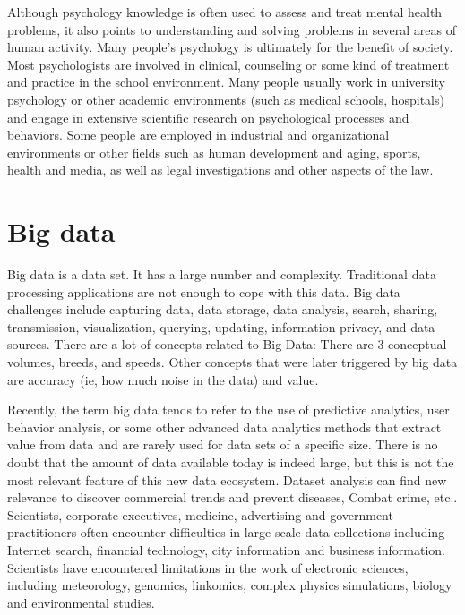 Although psychology knowledge is often used to assess and treat 
mental health problems, it also points to understanding and solving 
problems in several areas of human activity. Many people's psychology
 is ultimately for the benefit of society. Most psychologists are 
involved in clinical, counseling or some kind of treatment and 
practice in the school environment. Many people usually work in 
university psychology or other academic environments (such as medical
 schools, hospitals) and engage in extensive scientific research on 
psychological processes and behaviors. Some people are employed in 
industrial and organizational environments or other fields such as 
human development and aging, sports, health and media, as well as 
legal investigations and other aspects of the law.

\section{Big data}

Big data is a data set. It has a large number and complexity. 
Traditional data processing applications are not enough to cope with 
this data. Big data challenges include capturing data, data storage, 
data analysis, search, sharing, transmission, visualization, querying,
 updating, information privacy, and data sources. There are a lot of 
concepts related to Big Data: There are 3 conceptual volumes, breeds,
 and speeds. Other concepts that were later triggered by big data are
 accuracy (ie, how much noise in the data) and value\cite{editor03}.

Recently, the term big data tends to refer to the use of predictive 
analytics, user behavior analysis, or some other advanced data 
analytics methods that extract value from data and are rarely used for
 data sets of a specific size. There is no doubt that the amount of 
data available today is indeed large, but this is not the most 
relevant feature of this new data ecosystem. Dataset analysis can 
find new relevance to discover commercial trends and prevent 
diseases, Combat crime, etc.\cite{editor04}.  Scientists, corporate 
executives, medicine, advertising and government practitioners often 
encounter difficulties in large-scale data collections including Internet 
search, financial technology, city information and business 
information. Scientists have encountered limitations in the work of 
electronic sciences, including meteorology, genomics, linkomics, 
complex physics simulations, biology and environmental studies\cite{editor05}.

